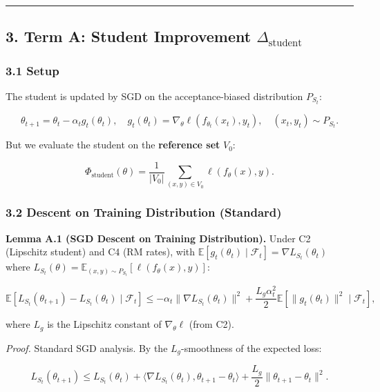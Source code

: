 \documentclass[
  12pt,
]{article}
\begin{document}
\begin{center}\rule{0.5\linewidth}{0.5pt}\end{center}

\subsection{\texorpdfstring{3. Term A: Student Improvement
\(\Delta_{\text{student}}\)}{3. Term A: Student Improvement \textbackslash Delta\_\{\textbackslash text\{student\}\}}}\label{term-a-student-improvement-delta_textstudent}

\subsubsection{3.1 Setup}\label{setup}

The student is updated by SGD on the acceptance-biased distribution
\(P_{S_t}\):

\[\theta_{t+1} = \theta_t - \alpha_t g_t(\theta_t), \quad g_t(\theta_t) = \nabla_\theta \ell(f_{\theta_t}(x_t), y_t), \quad (x_t, y_t) \sim P_{S_t}.\]

But we evaluate the student on the \textbf{reference set} \(V_0\):

\[\Phi_{\text{student}}(\theta) = \frac{1}{|V_0|} \sum_{(x,y) \in V_0} \ell(f_\theta(x), y).\]

\subsubsection{3.2 Descent on Training Distribution
(Standard)}\label{descent-on-training-distribution-standard}

\textbf{Lemma A.1 (SGD Descent on Training Distribution).} Under C2
(Lipschitz student) and C4 (RM rates), with
\(\mathbb{E}[g_t(\theta_t) \mid \mathcal{F}_t] = \nabla L_{S_t}(\theta_t)\)
where
\(L_{S_t}(\theta) = \mathbb{E}_{(x,y) \sim P_{S_t}}[\ell(f_\theta(x), y)]\):

\[\mathbb{E}[L_{S_t}(\theta_{t+1}) - L_{S_t}(\theta_t) \mid \mathcal{F}_t] \leq -\alpha_t \|\nabla L_{S_t}(\theta_t)\|^2 + \frac{L_g \alpha_t^2}{2} \mathbb{E}[\|g_t(\theta_t)\|^2 \mid \mathcal{F}_t],\]

where \(L_g\) is the Lipschitz constant of \(\nabla_\theta \ell\) (from
C2).

\emph{Proof.} Standard SGD analysis. By the \(L_g\)-smoothness of the
expected loss:

\[L_{S_t}(\theta_{t+1}) \leq L_{S_t}(\theta_t) + \langle \nabla L_{S_t}(\theta_t), \theta_{t+1} - \theta_t \rangle + \frac{L_g}{2} \|\theta_{t+1} - \theta_t\|^2.\]
\end{document}

